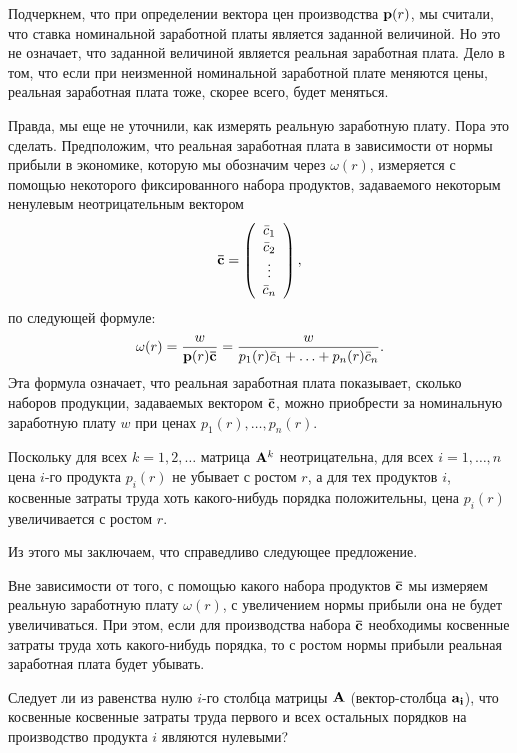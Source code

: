     Подчеркнем, что при определении вектора цен производства $\mathbf{p}(r)$, мы
    считали, что ставка номинальной заработной платы является заданной
    величиной. Но это не означает, что заданной величиной является
    реальная заработная плата. Дело в том, что если при неизменной
    номинальной заработной плате меняются цены, реальная заработная
    плата тоже, скорее всего, будет меняться.

     Правда, мы еще не уточнили, как
    измерять реальную заработную плату. Пора это сделать. Предположим, что реальная
    заработная плата в зависимости от нормы прибыли в экономике,
    которую мы обозначим через $\omega(r)$,
    измеряется с помощью некоторого фиксированного
    набора продуктов, задаваемого некоторым ненулевым неотрицательным вектором
    \[\mathbf{\bar{c}}=\left(
     \begin{array}{c}
        \bar{c}_{1} \\
        \bar{c}_{2} \\
        \vdots \\
        \bar{c}_{n}  \\
      \end{array}
    \right),\]
    по следующей формуле:
    \[\omega(r)=\frac{w}{\mathbf{p}(r)\mathbf{\bar{c}}}
    =\frac{w}{p_{1}(r)\bar{c}_{1}+\ldots+p_{n}(r)\bar{c}_{n}}.\]
    Эта формула означает, что реальная заработная плата показывает, сколько
    наборов продукции, задаваемых вектором $\mathbf{\bar{c}}$, можно
    приобрести за номинальную заработную плату $w$ при ценах
    $p_{1}(r),\ldots,p_{n}(r)$.


    Поскольку для всех $k=1,2,\ldots$ матрица $\mathbf{A}^{k}$
    неотрицательна, для всех $i=1,\ldots,n$ цена $i$-го продукта
     $p_{i}(r)$ не убывает с ростом $r$, а для тех продуктов $i$,
     косвенные затраты труда хоть какого-нибудь порядка
     положительны, цена $p_{i}(r)$ увеличивается с ростом $r$.

     Из этого мы заключаем, что справедливо следующее предложение.
     \begin{prop}
     Вне зависимости от того, с
     помощью какого набора продуктов $\mathbf{\bar{c}}$ мы измеряем
     реальную заработную плату $\omega(r)$, с увеличением нормы прибыли она не
     будет увеличиваться. При этом, если для производства набора
     $\mathbf{\bar{c}}$ необходимы косвенные затраты труда хоть
     какого-нибудь порядка, то с ростом нормы прибыли реальная
     заработная плата будет убывать.
     \end{prop}


\begin{exer}
    Следует ли из равенства нулю $i$-го столбца матрицы $\mathbf{A}$ (вектор-столбца
    $\mathbf{a_{i}}$), что косвенные косвенные затраты труда первого и
    всех остальных порядков на производство продукта $i$ являются
    нулевыми?
\end{exer}


